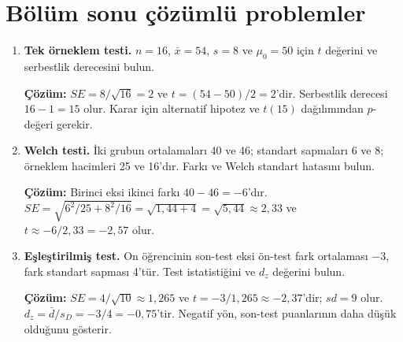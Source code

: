 \section{Bölüm sonu çözümlü problemler}

\begin{enumerate}
  \item \textbf{Tek örneklem testi.} $n=16$, $\bar x=54$, $s=8$ ve $\mu_0=50$ için $t$ değerini ve serbestlik derecesini bulun.

  \textbf{Çözüm:} $SE=8/\sqrt{16}=2$ ve $t=(54-50)/2=2$'dir. Serbestlik derecesi $16-1=15$ olur. Karar için alternatif hipotez ve $t(15)$ dağılımından $p$-değeri gerekir.

  \item \textbf{Welch testi.} İki grubun ortalamaları 40 ve 46; standart sapmaları 6 ve 8; örneklem hacimleri 25 ve 16'dır. Farkı ve Welch standart hatasını bulun.

  \textbf{Çözüm:} Birinci eksi ikinci farkı $40-46=-6$'dır. $SE=\sqrt{6^2/25+8^2/16}=\sqrt{1{,}44+4}=\sqrt{5{,}44}\approx2{,}33$ ve $t\approx-6/2{,}33=-2{,}57$ olur.

  \item \textbf{Eşleştirilmiş test.} On öğrencinin son-test eksi ön-test fark ortalaması $-3$, fark standart sapması 4'tür. Test istatistiğini ve $d_z$ değerini bulun.

  \textbf{Çözüm:} $SE=4/\sqrt{10}\approx1{,}265$ ve $t=-3/1{,}265\approx-2{,}37$'dir; $sd=9$ olur. $d_z=\bar d/s_D=-3/4=-0{,}75$'tir. Negatif yön, son-test puanlarının daha düşük olduğunu gösterir.
\end{enumerate}